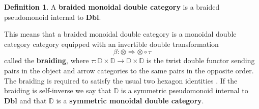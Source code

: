 \documentclass[oneside,final]{ucr}
\theoremstyle{definition}
\newtheorem{definition}[theorem]{Definition}
\newcommand{\maps}{\colon}
\newcommand{\define}[1]{{\bf \boldmath #1}}
\begin{document}
{%


\begin{definition}
	\label{defn:symmetric_monoidal_double_category}
A \define{braided monoidal double category} is a braided pseudomonoid internal to $\mathbf{Dbl}$. 
\end{definition}
This means that a braided monoidal double category is a monoidal double category
category equipped with an invertible double transformation
\[ \beta \maps \otimes \Rightarrow \otimes \circ \tau \]
called the \define{braiding}, where $\tau \maps \mathbb{D} \times \mathbb{D} \to \mathbb{D} \times \mathbb{D}$ is the twist double functor sending pairs in the object and arrow categories to the same pairs in the opposite order. The braiding is required to satisfy the usual two hexagon identities \cite[Sec.\ XI.1]{ML}.  If the braiding is self-inverse we say that $\mathbb{D}$ is a symmetric pseudomonoid internal to $\mathbf{Dbl}$ and that $\mathbb{D}$ is a \define{symmetric monoidal double category}.
	


}
\end{document}
